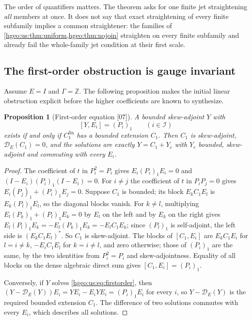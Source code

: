 \documentclass[11pt,letterpaper]{article}
\numberwithin{equation}{section}
\newtheorem{proposition}[proposition]{Proposition}
\theoremstyle{definition}
\theoremstyle{remark}
\newcommand{\Z}{\mathbb Z}
\newcommand{\src}[1]{\textup{\textsf{\small[#1]}}}
\newcommand{\Dg}{\mathscr D}
\newcommand{\fin}{\mathrm{fin}}
\begin{document}
The order of quantifiers matters. The theorem asks for one finite jet
straightening \emph{all} members at once. It does not say that exact
straightening of every finite subfamily implies a common straightener: the
families of \cref{hgeo:us:thm:uniform,hgeo:thm:nojoin} straighten on every
finite subfamily and already fail the whole-family jet condition at their
first scale.

\subsection{The first-order obstruction is gauge invariant}
Assume $E=I$ and $\Gamma=\Z$. The following proposition makes the initial
linear obstruction explicit before the higher coefficients are known to
synthesize.

\begin{proposition}[First-order equation \src{07}]\label{hgeo:us:prop:first}
A bounded skew-adjoint $Y$ with
\begin{equation}\label{hgeo:us:eq:firstorder}
 [Y,E_i]=(P_i)_1\qquad(i\in\mathcal I)
\end{equation}
exists if and only if $C_1^\fin$ has a bounded extension $C_1$. Then $C_1$ is
skew-adjoint, $\Dg_E(C_1)=0$, and the solutions are exactly $Y=C_1+Y_c$ with
$Y_c$ bounded, skew-adjoint and commuting with every $E_i$.
\end{proposition}
\begin{proof}
The coefficient of $t$ in $P_i^2=P_i$ gives $E_i(P_i)_1E_i=0$ and
$(I-E_i)(P_i)_1(I-E_i)=0$. For $i\ne j$ the coefficient of $t$ in $P_iP_j=0$
gives $E_i(P_j)_1+(P_i)_1E_j=0$. Suppose $C_1$ is bounded; its block
$E_kC_1E_l$ is $E_k(P_l)_1E_l$, so the diagonal blocks vanish. For $k\ne l$,
multiplying $E_l(P_k)_1+(P_l)_1E_k=0$ by $E_l$ on the left and by $E_k$ on
the right gives $E_l(P_l)_1E_k=-E_l(P_k)_1E_k=-E_lC_1E_k$; since $(P_l)_1$ is
self-adjoint, the left side is $(E_kC_1E_l)^*$. So $C_1$ is skew-adjoint.
The blocks of $[C_1,E_i]$ are $E_kC_1E_i$ for $l=i\ne k$,
$-E_iC_1E_l$ for $k=i\ne l$, and zero otherwise; those of $(P_i)_1$ are the
same, by the two identities from $P_i^2=P_i$ and skew-adjointness. Equality
of all blocks on the dense algebraic direct sum gives
$[C_1,E_i]=(P_i)_1$.

Conversely, if $Y$ solves \eqref{hgeo:us:eq:firstorder}, then
$(Y-\Dg_E(Y))E_i=YE_i-E_iYE_i=(P_i)_1E_i$ for every $i$, so $Y-\Dg_E(Y)$ is
the required bounded extension $C_1$. The difference of two solutions
commutes with every $E_i$, which describes all solutions.
\end{proof}
\end{document}
